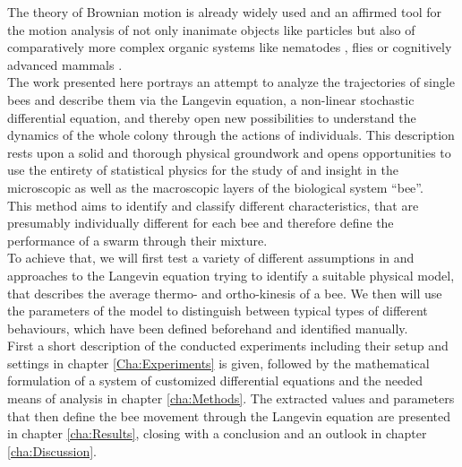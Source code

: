 The theory of Brownian motion is already widely used and an affirmed tool for the motion analysis of not only inanimate objects like particles \cite{de2007} \cite{ruthardt2011} \cite{johnson2013} \cite{Mousavi2017} but also of comparatively more complex organic systems like nematodes \cite{ben2009}, flies \cite{ravbar2019} \cite{valente2007} \cite{connolly1967} or cognitively advanced mammals \cite{fonio2009} \cite{de2014}.
\\
The work presented here portrays an attempt to analyze the trajectories of single bees and describe them via the Langevin equation, a non-linear stochastic differential equation, and thereby open new possibilities to understand the dynamics of the whole colony through the actions of individuals. This description rests upon a solid and thorough physical groundwork and opens opportunities to use the entirety of statistical physics for the study of and insight in the microscopic as well as the macroscopic layers of the biological system ``bee''.
\\
This method aims to identify and classify different characteristics, that are presumably individually different for each bee and therefore define the performance of a swarm through their mixture.
\\
To achieve that, we will first test a variety of different assumptions in and approaches to the Langevin equation trying to identify a suitable physical model, that describes the average thermo- and ortho-kinesis of a bee.
We then will use the parameters of the model to distinguish between typical types of different behaviours, which have been defined beforehand and identified manually.
\\
First a short description of the conducted experiments including their setup and settings in chapter \ref{Cha:Experiments} is given, followed by the mathematical formulation of a system of customized differential equations and the needed means of analysis in chapter \ref{cha:Methods}. The extracted values and parameters that then define the bee movement through the Langevin equation are presented in chapter \ref{cha:Results}, closing with a conclusion and an outlook in chapter \ref{cha:Discussion}.

